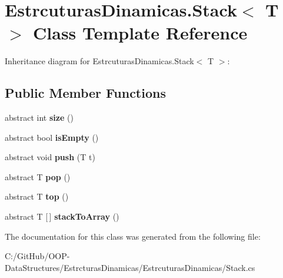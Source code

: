 \hypertarget{class_estrcuturas_dinamicas_1_1_stack}{}\section{Estrcuturas\+Dinamicas.\+Stack$<$ T $>$ Class Template Reference}
\label{class_estrcuturas_dinamicas_1_1_stack}


Inheritance diagram for Estrcuturas\+Dinamicas.\+Stack$<$ T $>$\+:
\subsection*{Public Member Functions}
\begin{DoxyCompactItemize}
\item 
\mbox{\label{class_estrcuturas_dinamicas_1_1_stack_a47acf829b2ccaadd8b07d4b538ce016f}} 
abstract int {\bfseries size} ()
\item 
\mbox{\label{class_estrcuturas_dinamicas_1_1_stack_a5c6b5465fc4ca042fca5a233ad47dc9f}} 
abstract bool {\bfseries is\+Empty} ()
\item 
\mbox{\label{class_estrcuturas_dinamicas_1_1_stack_a8581e1a050ebd5830bb961deee4f1168}} 
abstract void {\bfseries push} (T t)
\item 
\mbox{\label{class_estrcuturas_dinamicas_1_1_stack_a6f7fa3a399448ece608902beb4dfae2b}} 
abstract T {\bfseries pop} ()
\item 
\mbox{\label{class_estrcuturas_dinamicas_1_1_stack_a71dc689e566b7767560c2b5ed043cfe7}} 
abstract T {\bfseries top} ()
\item 
\mbox{\label{class_estrcuturas_dinamicas_1_1_stack_a78d1003d31f92a612296a4cc50d94666}} 
abstract T \mbox{[}$\,$\mbox{]} {\bfseries stack\+To\+Array} ()
\end{DoxyCompactItemize}


The documentation for this class was generated from the following file\+:\begin{DoxyCompactItemize}
\item 
C\+:/\+Git\+Hub/\+O\+O\+P-\/\+Data\+Structures/\+Estrcturas\+Dinamicas/\+Estrcuturas\+Dinamicas/Stack.\+cs\end{DoxyCompactItemize}

